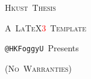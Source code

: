 \begin{center}

{\fontsize{38}{38}\selectfont\textsc{Hkust~Thesis}}
\vspace{6pt}

{\fontsize{25}{25}\selectfont\textsc{A~\LaTeX\textcolor{red}{3}~Template}}
\vspace{4pt}

{\fontsize{14}{14}\selectfont\texttt{@HKFoggyU}~Presents}
\vspace{2pt}

{\fontsize{9}{9}\selectfont\textsc{(No~Warranties)}}

\end{center}
